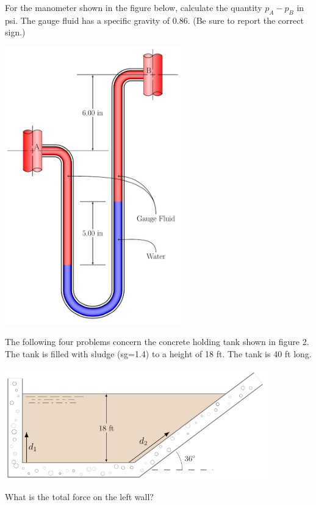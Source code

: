 \documentclass[multi,preview,varwidth=false,border=5,12pt]{standalone}
\begin{document}
\begin{question}
For the manometer shown in the figure below, calculate the quantity
$p_A - p_B$ in psi.  The gauge fluid has a specific gravity of 0.86.
(Be sure to report the correct sign.)

\includegraphics[width=3in]{imgs/mono4.pdf}


\begin{solution}
\end{solution}

\end{question}


\begin{question}

The following four problems concern the concrete
holding tank shown in figure 2. The tank is filled
with sludge (sg=1.4) to a height of 18 ft. The tank
is 40 ft long.

\includegraphics[width=4.5in]{imgs/SlurryWall.png}

What is the total force on the left wall?

\end{question}
\end{document}
